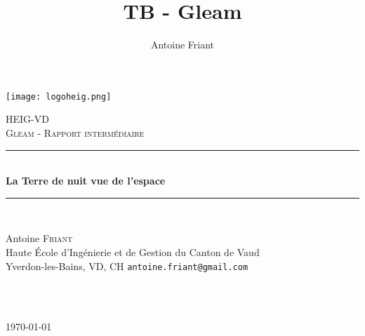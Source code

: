 \documentclass[a4paper]{report}
\title{TB - Gleam}
\author{Antoine Friant}
\begin{document}
\begin{titlepage}

\newcommand{\HRule}{\rule{\linewidth}{0.5mm}} %

\texttt{[image: logoheig.png]}\\ %

\vspace{1in}

\center %
 

\textsc{\LARGE HEIG-VD}\\[1.5cm] %
\textsc{\Large Gleam - Rapport intermédiaire}\\[0.5cm] %


\HRule \\[0.4cm]
{ \huge \bfseries La Terre de nuit vue de l'espace }\\ %
\Large\HRule \\[1cm]
\normalsize

\begin{minipage}[t]{0.48\textwidth}
\begin{flushleft} \large
Antoine \textsc{Friant} \\
\normalsize
Haute École d'Ingénierie et de Gestion du Canton de Vaud\\
Yverdon-les-Bains, VD, CH
\texttt{antoine.friant@gmail.com}
\end{flushleft}
\end{minipage}
~
\begin{minipage}[t]{0.49\textwidth}
\begin{flushright} \large
\end{flushright}
\end{minipage}\\[1cm]



{\large \today}\\
 

\vfill %

\end{titlepage}
\end{document}
